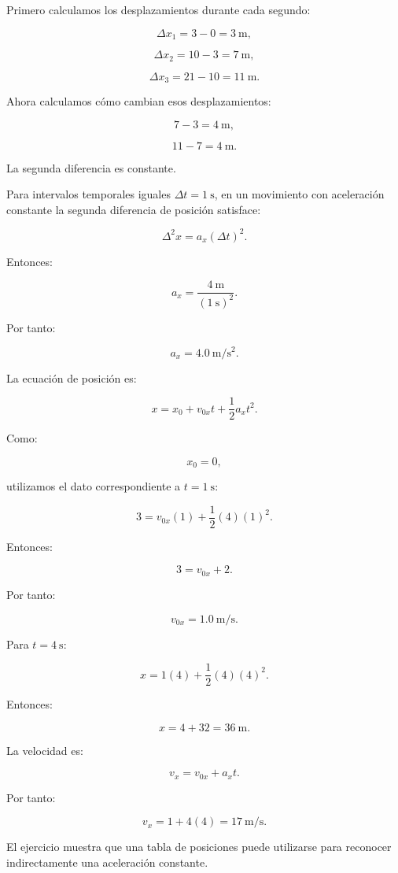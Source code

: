 \begin{explicacion}
Primero calculamos los desplazamientos durante cada segundo:

\[
\Delta x_1=3-0=\SI{3}{\meter},
\]

\[
\Delta x_2=10-3=\SI{7}{\meter},
\]

\[
\Delta x_3=21-10=\SI{11}{\meter}.
\]

Ahora calculamos cómo cambian esos desplazamientos:

\[
7-3=\SI{4}{\meter},
\]

\[
11-7=\SI{4}{\meter}.
\]

La segunda diferencia es constante.

Para intervalos temporales iguales \(\Delta t=\SI{1}{\second}\), en un movimiento con aceleración constante la segunda diferencia de posición satisface:

\[
\Delta^2x=a_x(\Delta t)^2.
\]

Entonces:

\[
a_x
=
\frac{\SI{4}{\meter}}
{(\SI{1}{\second})^2}.
\]

Por tanto:

\[ \boxed{a_x=\SI{4.0}{\meter\per\second\squared}}. \]

La ecuación de posición es:

\[
x=x_0+v_{0x}t+\frac{1}{2}a_xt^2.
\]

Como:

\[ x_0=0, \]

utilizamos el dato correspondiente a \(t=\SI{1}{\second}\):

\[
3
=
v_{0x}(1)
+
\frac{1}{2}(4)(1)^2.
\]

Entonces:

\[
3=v_{0x}+2.
\]

Por tanto:

\[ \boxed{v_{0x}=\SI{1.0}{\meter\per\second}}. \]

Para \(t=\SI{4}{\second}\):

\[
x
=
1(4)
+
\frac{1}{2}(4)(4)^2.
\]

Entonces:

\[
x
=
4+32
=
\boxed{\SI{36}{\meter}}.
\]

La velocidad es:

\[
v_x=v_{0x}+a_xt.
\]

Por tanto:

\[
v_x
=
1+4(4)
=
\boxed{\SI{17}{\meter\per\second}}.
\]

El ejercicio muestra que una tabla de posiciones puede utilizarse para reconocer indirectamente una aceleración constante.
\end{explicacion}


